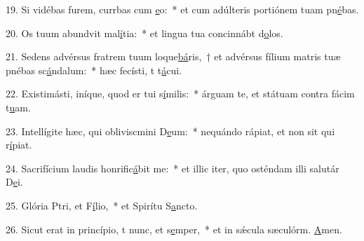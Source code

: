 19. Si vidébas furem, currbas cum \uline{e}o:~* et cum adúlteris portiónem tuam pn\uline{é}bas.\par 
20. Os tuum abundvit mal\uline{í}tia:~* et lingua tua concinnábt d\uline{o}los.\par 
21. Sedens advérsus fratrem tuum loque\uline{bá}ris,~† et advérsus fílium matris tuæ pnébas sc\uline{á}ndalum:~* hæc fecísti, t t\uline{á}cui.\par 
22. Existimásti, iníque, quod er tui s\uline{í}milis:~* árguam te, et státuam contra fácim t\uline{u}am.\par 
23. Intellígite hæc, qui obliviscmini D\uline{e}um:~* nequándo rápiat, et non sit qui r\uline{í}piat.\par 
24. Sacrifícium laudis honrific\uline{á}bit me:~* et illic iter, quo osténdam illi salutár D\uline{e}i.\par 
25. Glória Ptri, et F\uline{í}lio,~* et Spirítu S\uline{a}ncto.\par 
26. Sicut erat in princípio, t nunc, et s\uline{e}mper,~* et in sǽcula sæculórm. \uline{A}men.\par 
